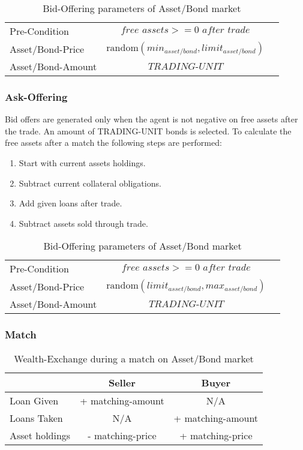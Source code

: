 \documentclass[Bachelorarbeit.tex]{subfiles}
\begin{document}
\begin{table}[H]
	\centering
	\caption{Bid-Offering parameters of Asset/Bond market}
	\begin{tabular} { l c r }
		\hline
		Pre-Condition & $\textit{free assets} >= \textit{0 after trade}$  \\
		Asset/Bond-Price & $\mathrm{random}(min_{asset/bond}, limit_{asset/bond})$ \\
		Asset/Bond-Amount & $\textit{TRADING-UNIT}$ \\
		\hline
	\end{tabular}
\end{table}

\subsubsection{Ask-Offering}
Bid offers are generated only when the agent is not negative on free assets after the trade. An amount of TRADING-UNIT bonds is selected. To calculate the free assets after a match the following steps are performed:

\begin{enumerate}
\item Start with current assets holdings.
\item Subtract current collateral obligations.
\item Add given loans after trade.
\item Subtract assets sold through trade.
\end{enumerate}

\begin{table}[H]
	\centering
	\caption{Bid-Offering parameters of Asset/Bond market}
	\begin{tabular} { l c r }
		\hline
		Pre-Condition & $\textit{free assets} >= \textit{0 after trade}$  \\
		Asset/Bond-Price & $\mathrm{random}(limit_{asset/bond}, max_{asset/bond})$ \\
		Asset/Bond-Amount & $\textit{TRADING-UNIT}$ \\
		\hline
	\end{tabular}
\end{table}

\subsubsection{Match}

\begin{table}[H]
	\centering
	\caption{Wealth-Exchange during a match on Asset/Bond market}
	\begin{tabular} { l c c }
		& Seller & Buyer \\
		\hline
		Loan Given & + matching-amount & N/A \\
		Loans Taken & N/A & + matching-amount \\
		Asset holdings & - matching-price & + matching-price \\
		\hline
	\end{tabular}
\end{table}
\end{document}
